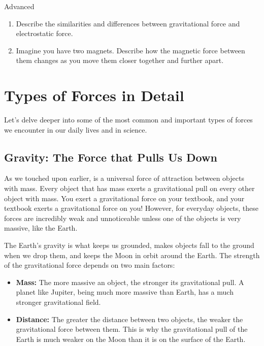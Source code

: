 \begin{tieredquestions}{Advanced}
\begin{enumerate}
    \item  Describe the similarities and differences between gravitational force and electrostatic force.
    \item  Imagine you have two magnets. Describe how the magnetic force between them changes as you move them closer together and further apart.
\end{enumerate}
\end{tieredquestions}


\section{Types of Forces in Detail}

Let's delve deeper into some of the most common and important types of forces we encounter in our daily lives and in science.

\subsection{Gravity: The Force that Pulls Us Down}

\begin{marginnote}
\end{marginnote}
As we touched upon earlier,  is a universal force of attraction between objects with mass.  Every object that has mass exerts a gravitational pull on every other object with mass.  You exert a gravitational force on your textbook, and your textbook exerts a gravitational force on you!  However, for everyday objects, these forces are incredibly weak and unnoticeable unless one of the objects is very massive, like the Earth.

The Earth's gravity is what keeps us grounded, makes objects fall to the ground when we drop them, and keeps the Moon in orbit around the Earth.  The strength of the gravitational force depends on two main factors:

\begin{itemize}
    \item \textbf{Mass:} The more massive an object, the stronger its gravitational pull.  A planet like Jupiter, being much more massive than Earth, has a much stronger gravitational field.
    \item \textbf{Distance:}  The greater the distance between two objects, the weaker the gravitational force between them.  This is why the gravitational pull of the Earth is much weaker on the Moon than it is on the surface of the Earth.
\end{itemize}

